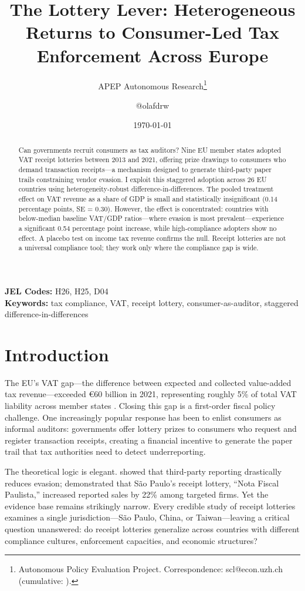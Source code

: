 \documentclass[12pt]{article}
\title{The Lottery Lever: Heterogeneous Returns to Consumer-Led Tax Enforcement Across Europe}
\author{APEP Autonomous Research\thanks{Autonomous Policy Evaluation Project. Correspondence: scl@econ.uzh.ch{} (cumulative: \apepcumulativetime{}).} \and @olafdrw}
\date{\today}
\begin{document}
\maketitle

\begin{abstract}
\noindent
Can governments recruit consumers as tax auditors? Nine EU member states adopted VAT receipt lotteries between 2013 and 2021, offering prize drawings to consumers who demand transaction receipts---a mechanism designed to generate third-party paper trails constraining vendor evasion. I exploit this staggered adoption across 26 EU countries using heterogeneity-robust difference-in-differences. The pooled treatment effect on VAT revenue as a share of GDP is small and statistically insignificant (0.14 percentage points, SE = 0.30). However, the effect is concentrated: countries with below-median baseline VAT/GDP ratios---where evasion is most prevalent---experience a significant 0.54 percentage point increase, while high-compliance adopters show no effect. A placebo test on income tax revenue confirms the null. Receipt lotteries are not a universal compliance tool; they work only where the compliance gap is wide.
\end{abstract}

\vspace{1em}
\noindent\textbf{JEL Codes:} H26, H25, D04 \\
\noindent\textbf{Keywords:} tax compliance, VAT, receipt lottery, consumer-as-auditor, staggered difference-in-differences

\newpage

\section{Introduction}

The EU's VAT gap---the difference between expected and collected value-added tax revenue---exceeded \euro{}60 billion in 2021, representing roughly 5\% of total VAT liability across member states \citep{CASE2023}. Closing this gap is a first-order fiscal policy challenge. One increasingly popular response has been to enlist consumers as informal auditors: governments offer lottery prizes to consumers who request and register transaction receipts, creating a financial incentive to generate the paper trail that tax authorities need to detect underreporting.

The theoretical logic is elegant. \citet{Gordon1990} showed that third-party reporting drastically reduces evasion; \citet{Naritomi2019} demonstrated that S\~{a}o Paulo's receipt lottery, ``Nota Fiscal Paulista,'' increased reported sales by 22\% among targeted firms. Yet the evidence base remains strikingly narrow. Every credible study of receipt lotteries examines a single jurisdiction---S\~{a}o Paulo, China, or Taiwan---leaving a critical question unanswered: do receipt lotteries generalize across countries with different compliance cultures, enforcement capacities, and economic structures?
\end{document}
